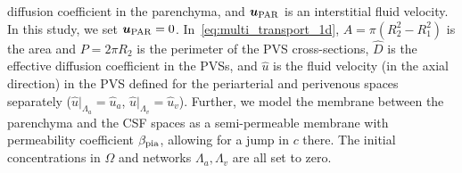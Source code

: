 \documentclass[fleqn,10pt]{wlscirep}
\begin{document}
diffusion coefficient in the parenchyma, and $\bm u_{\rm PAR}$ is an
interstitial fluid velocity. In this study, we set $\bm u_{\rm PAR} =
0$. In~\eqref{eq:multi_transport_1d}, $A = \pi (R_2^2 - R_1^2)$ is the
area and $P = 2 \pi R_2$ is the perimeter of the PVS cross-sections,
$\hat{D}$ is the effective diffusion coefficient in the PVSs, and
$\hat{u}$ is the fluid velocity (in the axial direction) in the PVS
defined for the periarterial and perivenous spaces separately
($\hat{u}|_{\Lambda_a} = \hat{u}_a$, $\hat{u}|_{\Lambda_v} =
\hat{u}_v$). Further, we model the membrane between the parenchyma and
the CSF spaces as a semi-permeable membrane with permeability
coefficient $\beta_{\rm pia}$, allowing for a jump in $c$ there. The
initial concentrations in $\Omega$ and networks $\Lambda_a, \Lambda_v$
are all set to zero.

\end{document}
